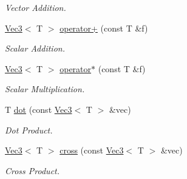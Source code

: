 \begin{DoxyCompactItemize}
\begin{DoxyCompactList}\small\item\em Vector Addition. \item\end{DoxyCompactList}\item 
\hypertarget{classMath_1_1Vec3_af217fea053208647a18926a46a138b2f}{
\hyperlink{classMath_1_1Vec3}{Vec3}$<$ T $>$ \hyperlink{classMath_1_1Vec3_af217fea053208647a18926a46a138b2f}{operator+} (const T \&f)}
\label{classMath_1_1Vec3_af217fea053208647a18926a46a138b2f}

\begin{DoxyCompactList}\small\item\em Scalar Addition. \item\end{DoxyCompactList}\item 
\hypertarget{classMath_1_1Vec3_ac7b4408b921fcbeed3334ab56c2a803e}{
\hyperlink{classMath_1_1Vec3}{Vec3}$<$ T $>$ \hyperlink{classMath_1_1Vec3_ac7b4408b921fcbeed3334ab56c2a803e}{operator$\ast$} (const T \&f)}
\label{classMath_1_1Vec3_ac7b4408b921fcbeed3334ab56c2a803e}

\begin{DoxyCompactList}\small\item\em Scalar Multiplication. \item\end{DoxyCompactList}\item 
\hypertarget{classMath_1_1Vec3_abfa9d62248e29b4c602d42d452223bc5}{
T \hyperlink{classMath_1_1Vec3_abfa9d62248e29b4c602d42d452223bc5}{dot} (const \hyperlink{classMath_1_1Vec3}{Vec3}$<$ T $>$ \&vec)}
\label{classMath_1_1Vec3_abfa9d62248e29b4c602d42d452223bc5}

\begin{DoxyCompactList}\small\item\em Dot Product. \item\end{DoxyCompactList}\item 
\hypertarget{classMath_1_1Vec3_a32fa09151b980451bf71bfcecd3b3095}{
\hyperlink{classMath_1_1Vec3}{Vec3}$<$ T $>$ \hyperlink{classMath_1_1Vec3_a32fa09151b980451bf71bfcecd3b3095}{cross} (const \hyperlink{classMath_1_1Vec3}{Vec3}$<$ T $>$ \&vec)}
\label{classMath_1_1Vec3_a32fa09151b980451bf71bfcecd3b3095}

\begin{DoxyCompactList}\small\item\em Cross Product. \item\end{DoxyCompactList}\end{DoxyCompactItemize}
